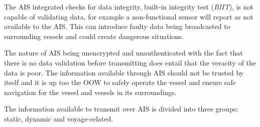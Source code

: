 \documentclass[../main.tex]{subfiles}
\begin{document}
The AIS integrated checks for data integrity, built-in integrity test (\textit{BIIT}), is not capable of validating data, for example a non-functional sensor will report as not available to the AIS. This can introduce faulty data being broadcasted to surrounding vessels and could create dangerous situations.

The nature of AIS being unencrypted and unauthenticated with the fact that there is no data validation before transmitting does entail that the veracity of the data is poor. The information available through AIS should not be trusted by itself and it is up too the OOW to safely operate the vessel and ensure safe navigation for the vessel and vessels in its surroundings. 

The information available to transmit over AIS is divided into three groups; static, dynamic and voyage-related.
\end{document}
